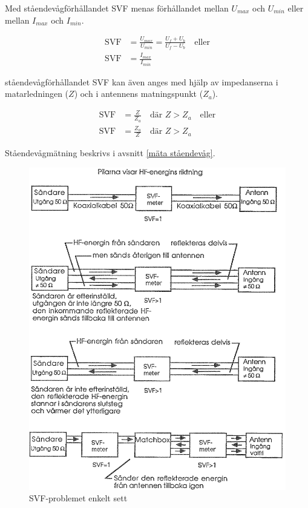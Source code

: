 Med ståendevågförhållandet SVF menas förhållandet mellan \(U_{max}\)
och \(U_{min}\) eller mellan \(I_{max}\) och \(I_{min}\).

\begin{align*}
  \text{SVF} &= \frac{U_{max}}{U_{min}} = \frac{U_f + U_b}{U_f - U_b} \quad
  \text{eller} \\
  \text{SVF} &= \frac{I_{max}}{I_{min}}
\end{align*}

ståendevågförhållandet SVF kan även anges med hjälp av impedanserna i
matarledningen (\(Z\)) och i antennens matningspunkt (\(Z_a\)).

\begin{align*}
  \text{SVF} &= \frac{Z}{Z_a} \quad \text{där } Z > Z_a \quad \text{eller} \\
  \text{SVF} &= \frac{Z_a}{Z} \quad \text{där } Z > Z_a
\end{align*}

Ståendevågmätning beskrivs i avsnitt \ref{mäta ståendevåg}.

\begin{figure}
  \includegraphics[width=\textwidth]{images/cropped_pdfs/bild_2_6-27.pdf}
  \caption{SVF-problemet enkelt sett}
  \label{fig:bildII6-27}
\end{figure}

